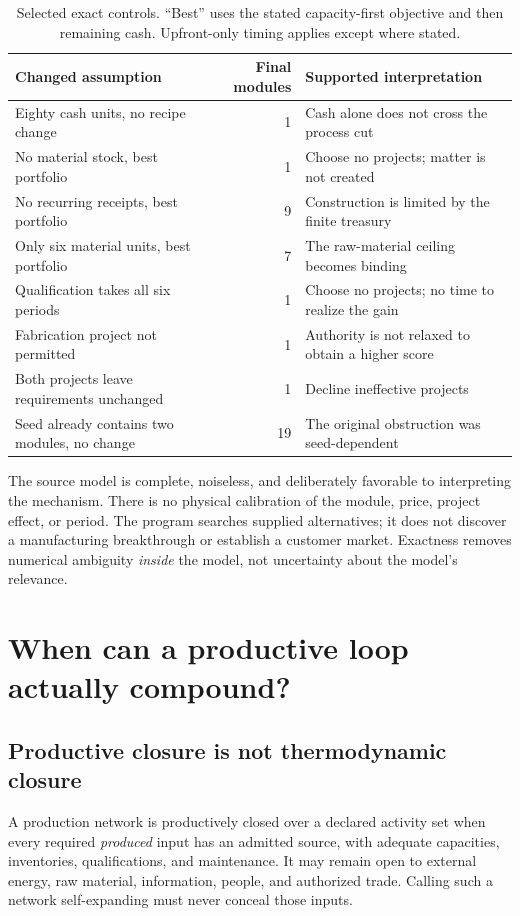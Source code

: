\documentclass[11pt,letterpaper]{article}
\newcommand{\1}{\mathbf 1}
\theoremstyle{remark}\newtheorem{remark}{Remark}[section]
\begin{document}
\begin{table}[htbp]\centering\small
\caption{Selected exact controls. ``Best'' uses the stated capacity-first objective and then remaining cash. Upfront-only timing applies except where stated.}
\begin{tabularx}{\linewidth}{@{}P{.38\linewidth}rY@{}}\toprule
Changed assumption & Final modules & Supported interpretation\\\midrule
Eighty cash units, no recipe change & 1 & Cash alone does not cross the process cut\\
No material stock, best portfolio & 1 & Choose no projects; matter is not created\\
No recurring receipts, best portfolio & 9 & Construction is limited by the finite treasury\\
Only six material units, best portfolio & 7 & The raw-material ceiling becomes binding\\
Qualification takes all six periods & 1 & Choose no projects; no time to realize the gain\\
Fabrication project not permitted & 1 & Authority is not relaxed to obtain a higher score\\
Both projects leave requirements unchanged & 1 & Decline ineffective projects\\
Seed already contains two modules, no change & 19 & The original obstruction was seed-dependent\\\bottomrule
\end{tabularx}\label{tab:controls}
\end{table}

The source model is complete, noiseless, and deliberately favorable to interpreting the mechanism. There is no physical calibration of the module, price, project effect, or period. The program searches supplied alternatives; it does not discover a manufacturing breakthrough or establish a customer market. Exactness removes numerical ambiguity \emph{inside} the model, not uncertainty about the model's relevance.

\section{When can a productive loop actually compound?}\label{sec:closure}
\subsection{Productive closure is not thermodynamic closure}
A production network is productively closed over a declared activity set when every required \emph{produced} input has an admitted source, with adequate capacities, inventories, qualifications, and maintenance. It may remain open to external energy, raw material, information, people, and authorized trade. Calling such a network self-expanding must never conceal those inputs.
\end{document}
